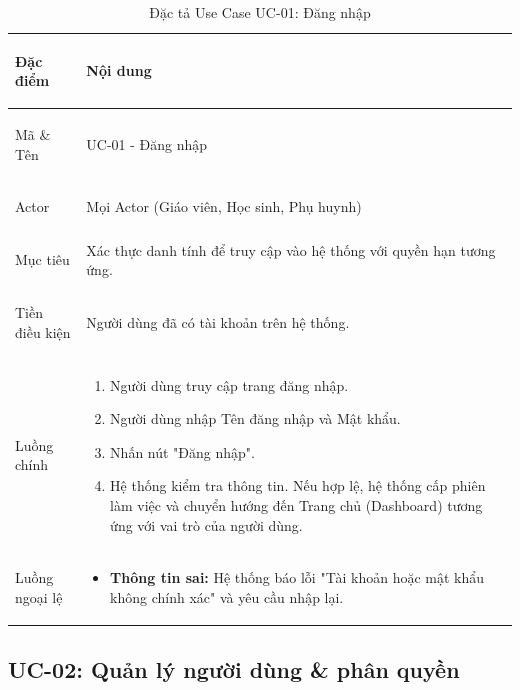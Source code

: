\begin{table}[htbp]
\centering
\small
\caption{Đặc tả Use Case UC-01: Đăng nhập}
\label{tab:uc01-dang-nhap}
\begin{tabularx}{\textwidth}{|>{\bfseries\raggedright\arraybackslash}p{2.5cm}|X|}
\hline
Đặc điểm & Nội dung \\ \hline
Mã \& Tên & UC-01 - Đăng nhập \\ \hline
Actor & Mọi Actor (Giáo viên, Học sinh, Phụ huynh) \\ \hline
Mục tiêu & Xác thực danh tính để truy cập vào hệ thống với quyền hạn tương ứng. \\ \hline
Tiền điều kiện & Người dùng đã có tài khoản trên hệ thống. \\ \hline
Luồng chính & 
\begin{enumerate}
    \item Người dùng truy cập trang đăng nhập.
    \item Người dùng nhập Tên đăng nhập và Mật khẩu.
    \item Nhấn nút "Đăng nhập".
    \item Hệ thống kiểm tra thông tin. Nếu hợp lệ, hệ thống cấp phiên làm việc và chuyển hướng đến Trang chủ (Dashboard) tương ứng với vai trò của người dùng.
\end{enumerate} \\ \hline
Luồng ngoại lệ & 
\begin{itemize}
    \item \textbf{Thông tin sai:} Hệ thống báo lỗi "Tài khoản hoặc mật khẩu không chính xác" và yêu cầu nhập lại.
\end{itemize} \\ \hline
\end{tabularx}
\end{table}

\subsection{UC-02: Quản lý người dùng \& phân quyền}

